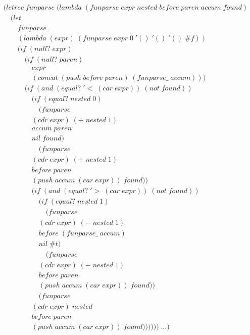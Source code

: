 \begin{figure}[htp]
\footnotesize
\caption{}\label{fig:letrecFunparse}
\begin{align*}
& (letrec \; funparse \; (lambda \; (funparse \; expr \; nested \; before \; paren \; accum \; found) \; 
\\& \quad (let \; 
\\& \qquad funparse\_ \; 
\\& \qquad (lambda \; (expr) \; (funparse \; expr \; 0 \; '() \; '() \; '() \; \#f))
\\& \qquad (if \; (null? \; expr)
\\& \qquad \quad (if \; (null? \; paren) \; 
\\& \qquad \qquad expr
\\& \qquad \qquad (concat \; (push \; before \; paren) \; (funparse\_ \; accum)))
\\& \qquad \quad (if \; (and \; (equal? \; '< \; (car \; expr)) \; (not \; found))
\\& \qquad \qquad (if \; (equal? \; nested \; 0)
\\& \qquad \qquad \quad (funparse \; 
\\& \qquad \qquad (cdr \; expr) \; (+ \; nested \; 1) \; 
\\& \qquad \qquad accum \; paren \; 
\\& \qquad \qquad nil \; found)
\\& \qquad \qquad \quad (funparse \; 
\\& \qquad \qquad (cdr \; expr) \; (+ \; nested \; 1) \; 
\\& \qquad \qquad before \; paren \; 
\\& \qquad \qquad (push \; accum \; (car \; expr)) \; found))
\\& \qquad \qquad (if \; (and \; (equal? \; '> \; (car \; expr)) \; (not \; found))
\\& \qquad \qquad \quad (if \; (equal? \; nested \; 1)
\\& \qquad \qquad \qquad (funparse \; 
\\& \qquad \qquad \quad (cdr \; expr) \; (- \; nested \; 1) \; 
\\& \qquad \qquad \quad before \; (funparse\_ \; accum) \; 
\\& \qquad \qquad \quad nil \; \#t)
\\& \qquad \qquad \qquad (funparse \; 
\\& \qquad \qquad \quad (cdr \; expr) \; (- \; nested \; 1) \; 
\\& \qquad \qquad \quad before \; paren \; 
\\& \qquad \qquad \quad (push \; accum \; (car \; expr)) \; found))
\\& \qquad \qquad \quad (funparse \; 
\\& \qquad \qquad (cdr \; expr) \; nested \; 
\\& \qquad \qquad before \; paren \; 
\\& \qquad \qquad (push \; accum \; (car \; expr)) \; found)))))) \; \dots)
\end{align*}
\end{figure}

